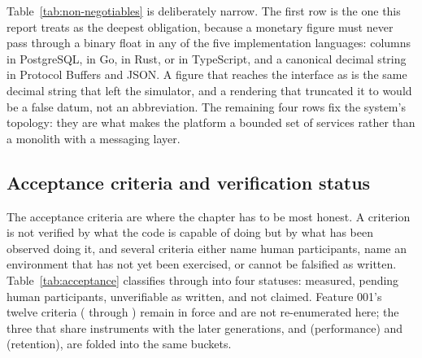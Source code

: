 Table~\ref{tab:non-negotiables} is deliberately narrow. The first row is the one this report
treats as the deepest obligation, because a monetary figure must never pass through a binary
float in any of the five implementation languages:  columns in PostgreSQL,
 in Go,  in Rust,  or 
in TypeScript, and a canonical decimal string in Protocol Buffers and JSON. A figure that reaches
the interface as  is the same decimal string that left the simulator, and a
rendering that truncated it to \fcnum{$1.234\ldots} would be a false datum, not an abbreviation.
The remaining four rows fix the system's topology: they are what makes the platform a bounded set
of services rather than a monolith with a messaging layer.

\subsection{Acceptance criteria and verification status}
\label{sec:acceptance}

The acceptance criteria are where the chapter has to be most honest. A criterion is not verified
by what the code is capable of doing but by what has been observed doing it, and several criteria
either name human participants, name an environment that has not yet been exercised, or cannot be
falsified as written. Table~\ref{tab:acceptance} classifies  through 
into four statuses: measured, pending human participants, unverifiable as written, and not
claimed. Feature 001's twelve criteria ( through ) remain in force and
are not re-enumerated here; the three that share instruments with the later generations,
 and  (performance) and  (retention), are folded into the
same buckets.

